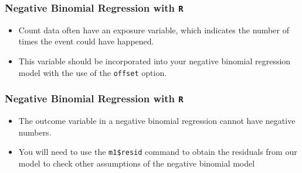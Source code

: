 \documentclass[MASTER.tex]{subfiles}
\begin{document}
\begin{frame}[fragile]
	\frametitle{Negative Binomial Regression with \texttt{R} }
	\Large
	\begin{itemize}
	\item
	Count data often have an exposure variable, which indicates the number of times the event could have happened. 
	\item This variable should be incorporated into your negative binomial regression model with the 
	use of the \texttt{offset} option. 
	\end{itemize}
\end{frame}
\begin{frame}[fragile]
	\frametitle{Negative Binomial Regression with \texttt{R} }
	\Large
		\begin{itemize}
	\item
	The outcome variable in a negative binomial regression cannot have negative numbers.
	\item You will need to use the \texttt{m1\$resid} command to obtain the residuals from our model to check 
	other assumptions of the negative binomial model 
	\end{itemize}
\end{frame}


\end{document}
